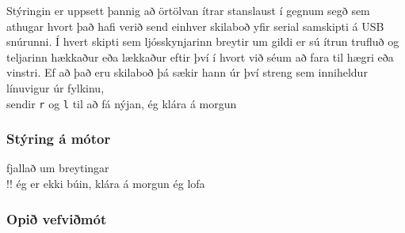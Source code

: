 Stýringin er uppsett þannig að örtölvan ítrar stanslaust í gegnum segð sem athugar hvort það hafi verið send einhver skilaboð yfir serial samskipti á USB snúrunni. Í hvert skipti sem ljósskynjarinn breytir um gildi er sú ítrun trufluð og teljarinn hækkaður eða lækkaður eftir því í hvort við séum að fara til hægri eða vinstri. Ef að það eru skilaboð þá sækir hann úr því streng sem inniheldur línuvigur úr fylkinu,\\
sendir \texttt{r} og \texttt{l} til að fá nýjan, ég klára á morgun
\subsubsection{Stýring á mótor}
fjallað um breytingar\\ 
!! ég er ekki búin, klára á morgun ég lofa
\subsubsection{Opið vefviðmót}
